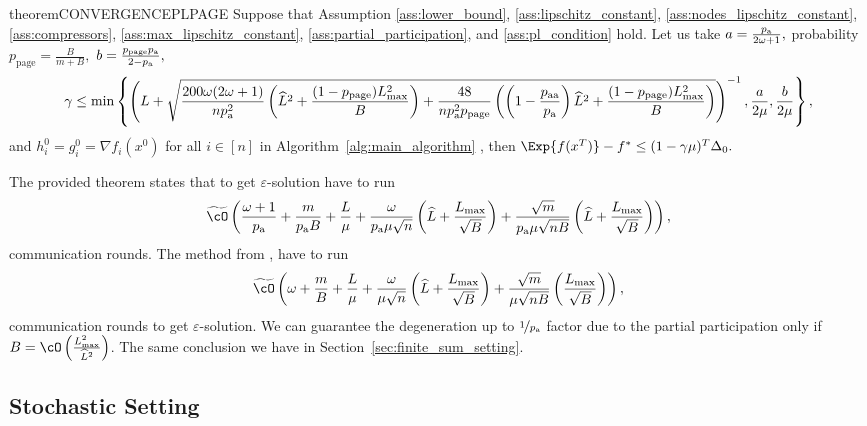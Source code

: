 \documentclass{article}
\newcommand{\algorithmname}{DASHA-PP}
\newcommand*{\probavailable}{\ensuremath{p_{\textnormal{a}}}}
\newcommand*{\probpairaa}{\ensuremath{p_{\textnormal{aa}}}}
\newcommand*{\probpage}{\ensuremath{p_{\text{page}}}}
\begin{document}
\begin{restatable}{theorem}{CONVERGENCEPLPAGE}
  \label{theorem:page_pl}
  Suppose that Assumption \ref{ass:lower_bound}, \ref{ass:lipschitz_constant}, \ref{ass:nodes_lipschitz_constant}, \ref{ass:compressors}, \ref{ass:max_lipschitz_constant}, \ref{ass:partial_participation}, and \ref{ass:pl_condition} hold. Let us take $a = \frac{\probavailable}{2 \omega + 1},$ probability $\probpage = \frac{B}{m + B}, $ $b = \frac{\probpage \probavailable}{2 - \probavailable},$
  {\scriptsize $$\gamma \leq \min\left\{\left(L + \sqrt{\frac{200 \omega (2 \omega + 1)}{n \probavailable^2} \left(\widehat{L}^2 + \frac{(1 - \probpage)L_{\max}^2}{B}\right) + \frac{48}{n \probavailable^2 \probpage}\left(\left(1 - \frac{\probpairaa}{\probavailable}\right) \widehat{L}^2 + \frac{(1 - \probpage)L_{\max}^2}{B}\right)}\right)^{-1}, \frac{a}{2\mu} , \frac{b}{2\mu}\right\},$$}
  and $h^{0}_i = g^{0}_i = \nabla f_i(x^0)$ for all $i \in [n]$ in Algorithm~\ref{alg:main_algorithm} \algname{(\algorithmname-PAGE)},
  then $\Exp{f(x^{T})} - f^* \leq (1 - \gamma \mu)^{T} \Delta_0.$
\end{restatable}

The provided theorem states that to get $\varepsilon$-solution \algname{\algorithmname} have to run
\begin{align*}
  \widetilde{\cO}\left(\frac{\omega + 1}{\probavailable} + \frac{m}{\probavailable B} + \frac{L}{\mu} + \frac{\omega}{\probavailable \mu \sqrt{n}} \left(\widehat{L} + \frac{L_{\max}}{\sqrt{B}}\right) + \frac{\sqrt{m}}{\probavailable \mu \sqrt{n B}} \left(\widehat{L} + \frac{L_{\max}}{\sqrt{B}}\right)\right),
\end{align*}
communication rounds. The method  from \citep{tyurin2022dasha}, have to run
\begin{align*}
  \widetilde{\cO}\left(\omega + \frac{m}{B} + \frac{L}{\mu} + \frac{\omega}{\mu \sqrt{n}} \left(\widehat{L} + \frac{L_{\max}}{\sqrt{B}}\right) + \frac{\sqrt{m}}{\mu \sqrt{n B}} \left(\frac{L_{\max}}{\sqrt{B}}\right)\right),
\end{align*}
communication rounds to get $\varepsilon$-solution. We can guarantee the degeneration up to $\nicefrac{1}{\probavailable}$ factor due to the partial participation only if $B = \cO\left(\frac{L_{\max}^2}{\widehat{L}^2}\right)$. The same conclusion we have in Section~\ref{sec:finite_sum_setting}.

\subsection{Stochastic Setting}
\end{document}
